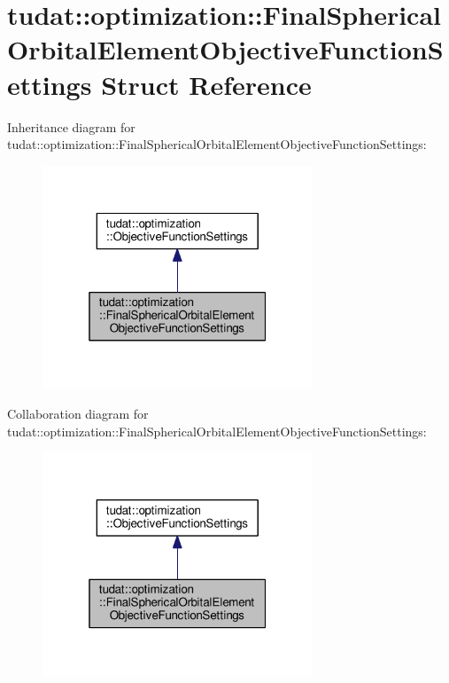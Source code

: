 \hypertarget{structtudat_1_1optimization_1_1FinalSphericalOrbitalElementObjectiveFunctionSettings}{}\section{tudat\+:\+:optimization\+:\+:Final\+Spherical\+Orbital\+Element\+Objective\+Function\+Settings Struct Reference}
\label{structtudat_1_1optimization_1_1FinalSphericalOrbitalElementObjectiveFunctionSettings}


Inheritance diagram for tudat\+:\+:optimization\+:\+:Final\+Spherical\+Orbital\+Element\+Objective\+Function\+Settings\+:
\nopagebreak
\begin{figure}[H]
\begin{center}
\leavevmode
\includegraphics[width=229pt]{structtudat_1_1optimization_1_1FinalSphericalOrbitalElementObjectiveFunctionSettings__inherit__graph}
\end{center}
\end{figure}


Collaboration diagram for tudat\+:\+:optimization\+:\+:Final\+Spherical\+Orbital\+Element\+Objective\+Function\+Settings\+:
\nopagebreak
\begin{figure}[H]
\begin{center}
\leavevmode
\includegraphics[width=229pt]{structtudat_1_1optimization_1_1FinalSphericalOrbitalElementObjectiveFunctionSettings__coll__graph}
\end{center}
\end{figure}
